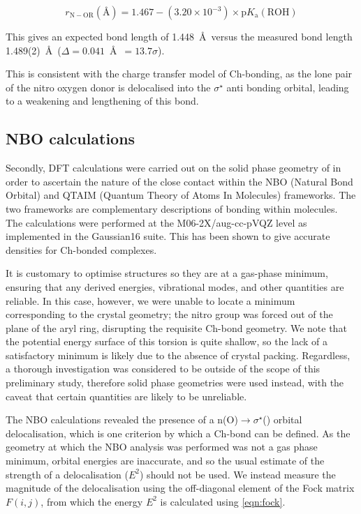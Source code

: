 \begin{refsection}
\begin{equation}
	r_{\mathrm{N-OR}} (\text{\AA}) = 1.467 - (3.20\times10^{-3}) \times \mathrm{p}K_{\mathrm{a}}(\mathrm{ROH})
	\label{eqn:scp}
\end{equation}

This gives an expected bond length of 1.448~\AA~versus the measured bond length 1.489(2)~\AA\ ($\Delta = 0.041$~\AA~$= 13.7\sigma$).

This is consistent with the charge transfer model of Ch-bonding, as the lone pair of the nitro oxygen donor is delocalised into the $\sigma^{\star}$ anti bonding orbital, leading to a weakening and lengthening of this bond.\autocite{Reed1988}

\subsection{NBO calculations}
Secondly, DFT calculations were carried out on the solid phase geometry of  in order to ascertain the nature of the  close contact within the NBO (Natural Bond Orbital) and QTAIM (Quantum Theory of Atoms In Molecules) frameworks.\autocite{Bader1991,NBO7}
The two frameworks are complementary descriptions of bonding within molecules.
The calculations were performed at the M06-2X/aug-cc-pVQZ level as implemented in the Gaussian16 suite.\autocite{gaussian16,Zhao2008,Woon1995}
This has been shown to give accurate densities for Ch-bonded complexes.\autocite{Kim2019}

It is customary to optimise structures so they are at a gas-phase minimum, ensuring that any derived energies, vibrational modes, and other quantities are reliable.
In this case, however, we were unable to locate a minimum corresponding to the crystal geometry; the nitro group was forced out of the plane of the aryl ring, disrupting the requisite Ch-bond geometry.
We note that the potential energy surface of this torsion is quite shallow, so the lack of a satisfactory minimum is likely due to the absence of crystal packing.
Regardless, a thorough investigation was considered to be outside of the scope of this preliminary study, therefore solid phase geometries were used instead, with the caveat that certain quantities are likely to be unreliable.

The NBO calculations revealed the presence of a n(O)$\rightarrow \sigma^{\star}$() orbital delocalisation, which is one criterion by which a Ch-bond can be defined.\autocite{Pascoe2017}
As the geometry at which the NBO analysis was performed was not a gas phase minimum, orbital energies are inaccurate, and so the usual estimate of the strength of a delocalisation ($E^2$) should not be used.
We instead measure the magnitude of the delocalisation using the off-diagonal element of the Fock matrix $F(i,j)$, from which the energy $E^2$ is calculated using \cref{eqn:fock}.


\end{refsection}
